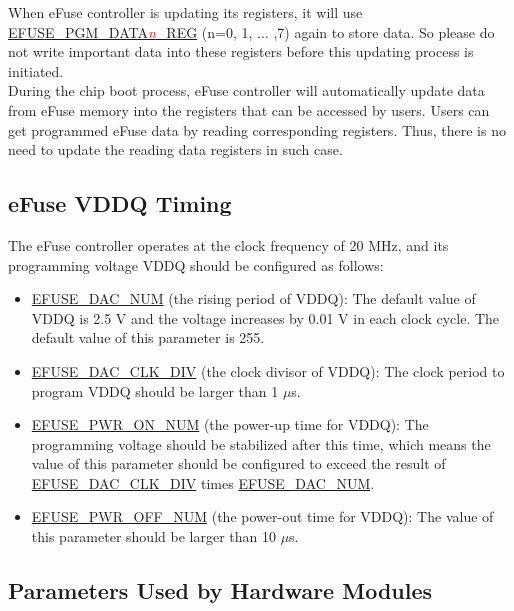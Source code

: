 \documentclass[main\_\_EN.tex]{subfiles}
\begin{document}
When eFuse controller is updating its registers, it will use \hyperref[regdesc:EFUSEPGMDATA0REG]{EFUSE\_PGM\_DATA\textcolor{red}{\it{n}}\_REG} (n=0, 1, ... ,7) again to store data. So please do not write important data into these registers before this updating process is initiated. \\
During the chip boot process, eFuse controller will automatically update data from eFuse memory into the registers that can be accessed by users. Users can get programmed eFuse data by reading corresponding registers. Thus, there is no need to update the reading data registers in such case.

\subsection{eFuse VDDQ Timing}
\label{sec:efuse-vddq-timing}

The eFuse controller operates at the clock frequency of 20 MHz, and its programming voltage VDDQ should be configured as follows:

\begin{itemize}
    \item \hyperref[fielddesc:EFUSEDACNUM]{EFUSE\_DAC\_NUM} (the rising period of VDDQ): The default value of VDDQ is 2.5 V and the voltage increases by 0.01 V in each clock cycle. The default value of this parameter is 255.
    \item \hyperref[fielddesc:EFUSEDACCLKDIV]{EFUSE\_DAC\_CLK\_DIV} (the clock divisor of VDDQ): The clock period to program VDDQ should be larger than 1 $\mu$s.
    \item \hyperref[fielddesc:EFUSEPWRONNUM]{EFUSE\_PWR\_ON\_NUM} (the power-up time for VDDQ): The programming voltage should be stabilized after this time, which means the value of this parameter should be configured to exceed the result of \hyperref[fielddesc:EFUSEDACCLKDIV]{EFUSE\_DAC\_CLK\_DIV} times \hyperref[fielddesc:EFUSEDACNUM]{EFUSE\_DAC\_NUM}.
    \item \hyperref[fielddesc:EFUSEPWROFFNUM]{EFUSE\_PWR\_OFF\_NUM} (the power-out time for VDDQ): The value of this parameter should be larger than 10 $\mu$s.
\end{itemize}



\subsection{Parameters Used by Hardware Modules}
\end{document}
